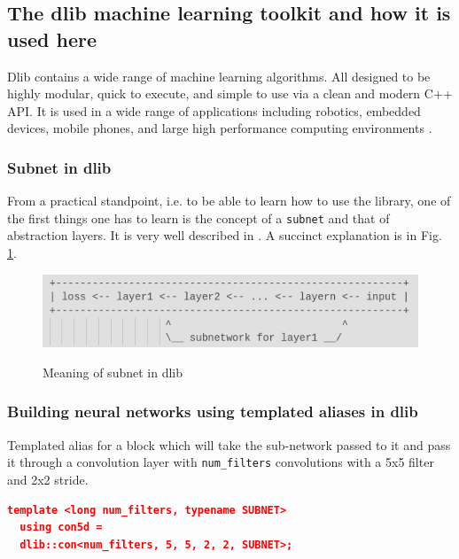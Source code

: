 \documentclass[a4paper, 12pt, oneside]{report}
\begin{document}
  \subsection{The dlib machine learning toolkit and how it is used here}
  Dlib contains a wide range of machine learning algorithms. All designed to be highly modular, quick to execute, and simple to use via a clean and modern C++ API. It is used in a wide range of applications including robotics, embedded devices, mobile phones, and large high performance computing environments \cite{dlib09}.
  
  \subsubsection{Subnet in dlib}
  From a practical standpoint, i.e. to be able to learn how to use the library, one of the first things one has to learn is the concept of a \texttt{subnet} and that of abstraction layers. It is very well described in \cite{dlibCLibrarylayersabstracth-2019-12-14}. A succinct explanation is in Fig. \ref{fig:subnet}.

  \begin{figure}[h]
      \caption{Meaning of subnet in dlib \protect\cite{dlibCLibrarydnnintroduction2excpp-2019-12-14}}
      \centering
      \includegraphics[width=1\textwidth]{subnet}
      \label{fig:subnet}
  \end{figure}

  \subsubsection{Building neural networks using templated aliases in dlib}
    
  Templated alias for a block which will take the sub-network passed to 
  it and pass it through a convolution layer with \texttt{num_filters} convolutions 
  with a 5x5 filter and 2x2 stride.
  
  
  \begin{lstlisting}[language=json,firstnumber=1]
  template <long num_filters, typename SUBNET> 
  using con5d = 
  dlib::con<num_filters, 5, 5, 2, 2, SUBNET>;
  \end{lstlisting}
  
\end{document}
